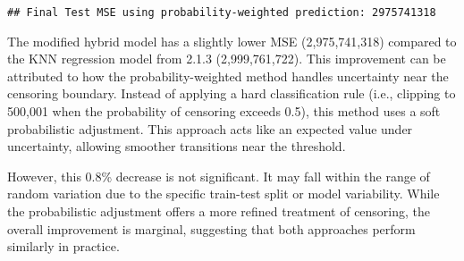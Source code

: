 \documentclass[
]{article}
\begin{document}
\begin{verbatim}
## Final Test MSE using probability-weighted prediction: 2975741318
\end{verbatim}

The modified hybrid model has a slightly lower MSE (2,975,741,318)
compared to the KNN regression model from 2.1.3 (2,999,761,722). This
improvement can be attributed to how the probability-weighted method
handles uncertainty near the censoring boundary. Instead of applying a
hard classification rule (i.e., clipping to 500,001 when the probability
of censoring exceeds 0.5), this method uses a soft probabilistic
adjustment. This approach acts like an expected value under uncertainty,
allowing smoother transitions near the threshold.

However, this 0.8\% decrease is not significant. It may fall within the
range of random variation due to the specific train-test split or model
variability. While the probabilistic adjustment offers a more refined
treatment of censoring, the overall improvement is marginal, suggesting
that both approaches perform similarly in practice.
\end{document}
